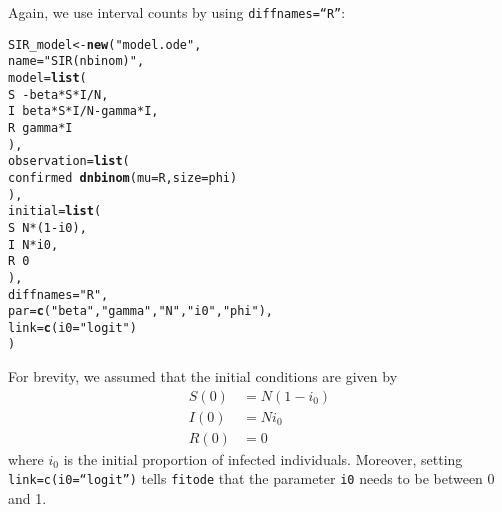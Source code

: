 \documentclass{article}\usepackage[]{graphicx}\usepackage[]{color}
\makeatletter
\newcommand{\hlnum}[1]{\textcolor[rgb]{0.686,0.059,0.569}{#1}}%
\newcommand{\hlstr}[1]{\textcolor[rgb]{0.192,0.494,0.8}{#1}}%
\newcommand{\hlopt}[1]{\textcolor[rgb]{0,0,0}{#1}}%
\newcommand{\hlstd}[1]{\textcolor[rgb]{0.345,0.345,0.345}{#1}}%
\newcommand{\hlkwb}[1]{\textcolor[rgb]{0.69,0.353,0.396}{#1}}%
\newcommand{\hlkwc}[1]{\textcolor[rgb]{0.333,0.667,0.333}{#1}}%
\newcommand{\hlkwd}[1]{\textcolor[rgb]{0.737,0.353,0.396}{\textbf{#1}}}%
\newenvironment{kframe}{%
 \def\at@end@of@kframe{}%
 \ifinner\ifhmode%
  \def\at@end@of@kframe{\end{minipage}}%
  \begin{minipage}{\columnwidth}%
 \fi\fi%
 \def\FrameCommand##1{\hskip\@totalleftmargin \hskip-\fboxsep
 \colorbox{shadecolor}{##1}\hskip-\fboxsep
     \hskip-\linewidth \hskip-\@totalleftmargin \hskip\columnwidth}%
 \MakeFramed {\advance\hsize-\width
   \@totalleftmargin\z@ \linewidth\hsize
   \@setminipage}}%
 {\par\unskip\endMakeFramed%
 \at@end@of@kframe}
\newenvironment{knitrout}{}{} %
\makeatother
\begin{document}
Again, we use interval counts by using \texttt{diffnames=``R''}:
\begin{knitrout}
\color{fgcolor}\begin{kframe}
\begin{alltt}
\hlstd{SIR_model} \hlkwb{<-} \hlkwd{new}\hlstd{(}\hlstr{"model.ode"}\hlstd{,}
    \hlkwc{name}\hlstd{=}\hlstr{"SIR (nbinom)"}\hlstd{,}
    \hlkwc{model}\hlstd{=}\hlkwd{list}\hlstd{(}
        \hlstd{S} \hlopt{~ -} \hlstd{beta} \hlopt{*} \hlstd{S} \hlopt{*} \hlstd{I}\hlopt{/}\hlstd{N,}
        \hlstd{I} \hlopt{~} \hlstd{beta} \hlopt{*} \hlstd{S} \hlopt{*} \hlstd{I}\hlopt{/}\hlstd{N} \hlopt{-} \hlstd{gamma} \hlopt{*} \hlstd{I,}
        \hlstd{R} \hlopt{~} \hlstd{gamma} \hlopt{*} \hlstd{I}
    \hlstd{),}
    \hlkwc{observation}\hlstd{=}\hlkwd{list}\hlstd{(}
        \hlstd{confirmed} \hlopt{~} \hlkwd{dnbinom}\hlstd{(}\hlkwc{mu}\hlstd{=R,} \hlkwc{size}\hlstd{=phi)}
    \hlstd{),}
    \hlkwc{initial}\hlstd{=}\hlkwd{list}\hlstd{(}
        \hlstd{S} \hlopt{~} \hlstd{N} \hlopt{*} \hlstd{(}\hlnum{1} \hlopt{-} \hlstd{i0),}
        \hlstd{I} \hlopt{~} \hlstd{N} \hlopt{*} \hlstd{i0,}
        \hlstd{R} \hlopt{~} \hlnum{0}
    \hlstd{),}
    \hlkwc{diffnames}\hlstd{=}\hlstr{"R"}\hlstd{,}
    \hlkwc{par}\hlstd{=}\hlkwd{c}\hlstd{(}\hlstr{"beta"}\hlstd{,} \hlstr{"gamma"}\hlstd{,} \hlstr{"N"}\hlstd{,} \hlstr{"i0"}\hlstd{,} \hlstr{"phi"}\hlstd{),}
    \hlkwc{link}\hlstd{=}\hlkwd{c}\hlstd{(}\hlkwc{i0}\hlstd{=}\hlstr{"logit"}\hlstd{)}
\hlstd{)}
\end{alltt}
\end{kframe}
\end{knitrout}
For brevity, we assumed that the initial conditions are given by
\begin{equation}
\begin{aligned}
S(0) &= N (1 - i_0)\\
I(0) &= N i_0\\
R(0) &= 0
\end{aligned}
\end{equation}
where $i_0$ is the initial proportion of infected individuals.
Moreover, setting \texttt{link=c(i0=``logit'')} tells \texttt{fitode} that the
parameter \texttt{i0} needs to be between 0 and 1.
\end{document}
